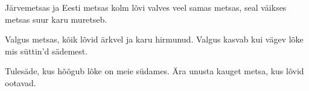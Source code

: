 J\"arvemetsas ja Eesti metsas
kolm l\~ovi valves veel
samas metsas, seal v\"aikses metsas
suur karu muretseb.

Valgus metsas, k\~oik l\~ovid \"arkvel
ja karu hirmunud.
Valgus kasvab kui v\"agev l\~oke
mis s\"uttin'd s\"ademest.

Tules\"ade, kus h\~o\~ogub l\~oke
on meie s\"udames.
\"Ara unusta kauget metsa,
kus l\~ovid ootavad.